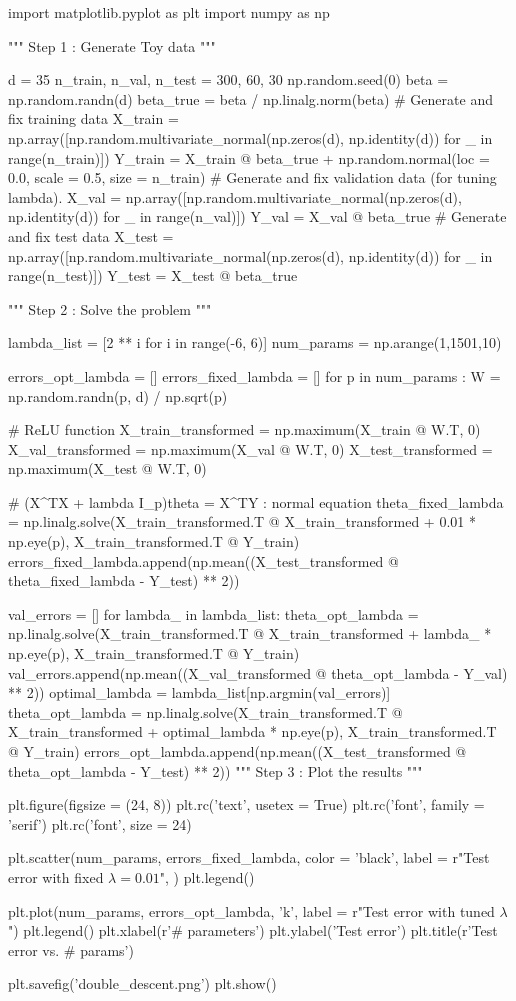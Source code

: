 \documentclass[10pt]{article}
\begin{document}
\begin{python}
import matplotlib.pyplot as plt 
import numpy as np 


"""
Step 1 : Generate Toy data
"""

d = 35
n_train, n_val, n_test = 300, 60, 30
np.random.seed(0)
beta = np.random.randn(d)
beta_true = beta / np.linalg.norm(beta)
# Generate and fix training data
X_train = np.array([np.random.multivariate_normal(np.zeros(d), np.identity(d)) for _ in range(n_train)])
Y_train = X_train @ beta_true + np.random.normal(loc = 0.0, scale = 0.5, size = n_train)
# Generate and fix validation data (for tuning lambda). 
X_val = np.array([np.random.multivariate_normal(np.zeros(d), np.identity(d)) for _ in range(n_val)])
Y_val = X_val @ beta_true 
# Generate and fix test data
X_test = np.array([np.random.multivariate_normal(np.zeros(d), np.identity(d)) for _ in range(n_test)])
Y_test = X_test @ beta_true 


"""
Step 2 : Solve the problem
"""    

lambda_list = [2 ** i for i in range(-6, 6)]
num_params = np.arange(1,1501,10)

errors_opt_lambda = []
errors_fixed_lambda = []
for p in num_params : 
    W = np.random.randn(p, d) / np.sqrt(p)

    # ReLU function
    X_train_transformed = np.maximum(X_train @ W.T, 0)
    X_val_transformed = np.maximum(X_val @ W.T, 0)
    X_test_transformed = np.maximum(X_test @ W.T, 0)

    # (X^TX + lambda I_p)theta = X^TY : normal equation
    theta_fixed_lambda = np.linalg.solve(X_train_transformed.T @ X_train_transformed + 0.01 * np.eye(p), X_train_transformed.T @ Y_train)
    errors_fixed_lambda.append(np.mean((X_test_transformed @ theta_fixed_lambda - Y_test) ** 2))

    val_errors = []
    for lambda_ in lambda_list:
        theta_opt_lambda = np.linalg.solve(X_train_transformed.T @ X_train_transformed + lambda_ * np.eye(p), X_train_transformed.T @ Y_train)
        val_errors.append(np.mean((X_val_transformed @ theta_opt_lambda - Y_val) ** 2))
    optimal_lambda = lambda_list[np.argmin(val_errors)]
    theta_opt_lambda = np.linalg.solve(X_train_transformed.T @ X_train_transformed + optimal_lambda * np.eye(p), X_train_transformed.T @ Y_train)
    errors_opt_lambda.append(np.mean((X_test_transformed @ theta_opt_lambda - Y_test) ** 2))
"""
Step 3 : Plot the results
"""    

plt.figure(figsize = (24, 8))
plt.rc('text', usetex = True)
plt.rc('font', family = 'serif')
plt.rc('font', size = 24)


plt.scatter(num_params, errors_fixed_lambda, color = 'black',
            label = r"Test error with fixed $\lambda = 0.01$",
            ) 
plt.legend()

plt.plot(num_params, errors_opt_lambda, 'k', label = r"Test error with tuned $\lambda$")
plt.legend()
plt.xlabel(r'$\#$ parameters')
plt.ylabel('Test error')
plt.title(r'Test error vs. $\#$ params')

plt.savefig('double_descent.png')
plt.show()
\end{python}
\end{document}
